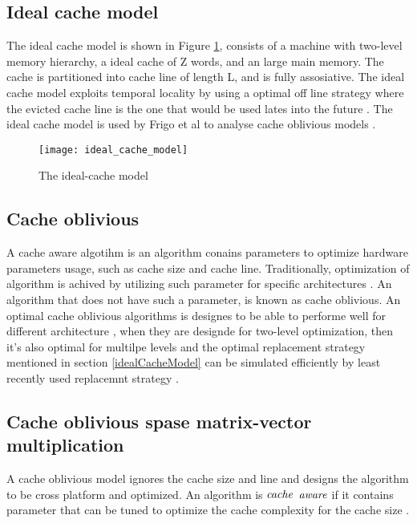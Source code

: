 {\subsection{Ideal cache model} \label{idealcacheModel}
The ideal cache model \cite{CacheOblivious1999} is shown in Figure \ref{fig:idealCacheModel}, consists of a machine with two-level memory hierarchy, a ideal cache of Z words, and an large main memory. The cache is partitioned into cache line of length L, and is fully assosiative. The ideal cache model exploits temporal locality by using a optimal off line strategy where the evicted cache line is the one that would be used lates into the future \cite{CacheOblivious1999}. The ideal cache model is used by Frigo et al to analyse cache oblivious models \cite{CacheOblivious1999}.

\begin{figure}
\texttt{[image: ideal\_cache\_model]}
\caption{The ideal-cache model \cite{CacheOblivious1999}}
\label{fig:idealCacheModel}

\end{figure}

\subsection{Cache oblivious}
A cache aware algotihm is an algorithm conains parameters to optimize hardware parameters usage, such as cache size and cache line. Traditionally, optimization of algorithm is achived by utilizing such parameter for specific architectures \cite{cacheaware}. An algorithm that does not have such a parameter, is known as cache oblivious. An optimal cache oblivious algorithms is designes to be able to performe well for different architecture \cite{COmultiplica2009}, when they are designde for two-level optimization, then it's also optimal for multilpe levels \cite{CacheOblivious1999} and the optimal replacement strategy mentioned in section \ref{idealCacheModel} can be simulated efficiently by least recently used replacemnt strategy \cite{CacheOblivious1999}. 

\subsection{Cache oblivious spase matrix-vector multiplication}


A cache oblivious model ignores the cache size and line and designs the algorithm to be cross platform and optimized. An algorithm is $\it{cache}$ $\it{aware}$ if it contains parameter that can be tuned to optimize the cache complexity for the cache size \cite{CacheOblivious1999}.


}
